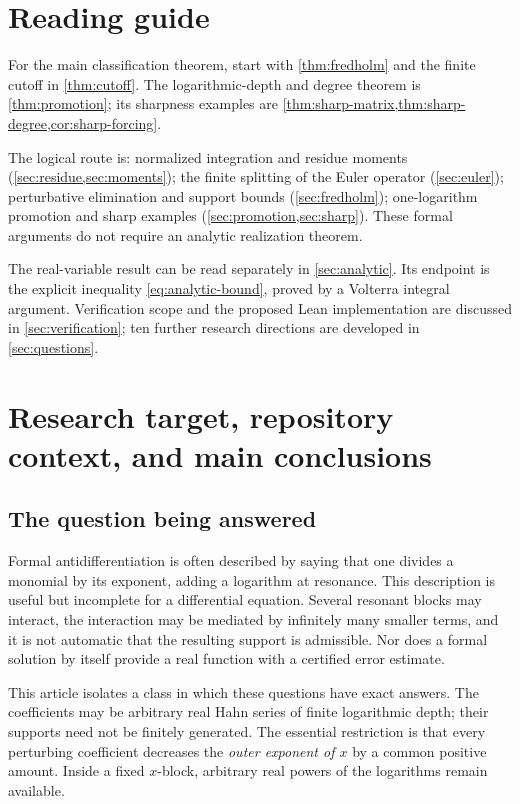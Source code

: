 \documentclass[11pt,a4paper]{article}
\numberwithin{equation}{section}
\theoremstyle{definition}
\theoremstyle{remark}
\begin{document}
\section*{Reading guide}
For the main classification theorem, start with \cref{thm:fredholm} and the
finite cutoff in \cref{thm:cutoff}. The logarithmic-depth and degree theorem
is \cref{thm:promotion}; its sharpness examples are
\cref{thm:sharp-matrix,thm:sharp-degree,cor:sharp-forcing}.

The logical route is: normalized integration and residue moments
(\cref{sec:residue,sec:moments}); the finite splitting of the Euler operator
(\cref{sec:euler}); perturbative elimination and support bounds
(\cref{sec:fredholm}); one-logarithm promotion and sharp examples
(\cref{sec:promotion,sec:sharp}). These formal arguments do not require an
analytic realization theorem.

The real-variable result can be read separately in \cref{sec:analytic}.
Its endpoint is the explicit inequality \eqref{eq:analytic-bound}, proved
by a Volterra integral argument. Verification scope and the proposed Lean
implementation are discussed in \cref{sec:verification}; ten further
research directions are developed in \cref{sec:questions}.
\clearpage

\section{Research target, repository context, and main conclusions}
\label{sec:introduction}

\subsection{The question being answered}
Formal antidifferentiation is often described by saying that one divides a monomial by its exponent, adding a logarithm at resonance. This description is useful but incomplete for a differential equation. Several resonant blocks may interact, the interaction may be mediated by infinitely many smaller terms, and it is not automatic that the resulting support is admissible. Nor does a formal solution by itself provide a real function with a certified error estimate.

This article isolates a class in which these questions have exact answers. The coefficients may be arbitrary real Hahn series of finite logarithmic depth; their supports need not be finitely generated. The essential restriction is that every perturbing coefficient decreases the \emph{outer exponent of $x$} by a common positive amount. Inside a fixed $x$-block, arbitrary real powers of the logarithms remain available.
\end{document}
